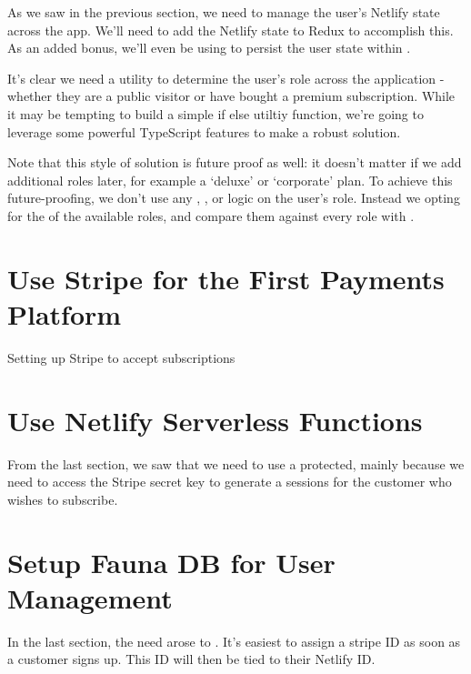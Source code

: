 \documentclass[paper=6in:9in,pagesize=pdftex,headinclude=on,footinclude=on,12pt]{scrbook}
\begin{document}
As we saw in the previous section, we need to manage the user's Netlify state across the app. We'll need to add the Netlify state to Redux to accomplish this. As an added bonus, we'll even be using  to persist the user state within .


It's clear we need a utility to determine the user's role across the application - whether they are a public visitor or have bought a premium subscription. While it may be tempting to build a simple if else utiltiy function, we're going to leverage some powerful TypeScript features to make a robust solution.

Note that this style of solution is future proof as well: it doesn't matter if we add additional roles later, for example a `deluxe' or `corporate' plan. To achieve this future-proofing, we don't use any , , or  logic on the user's role. Instead we opting for the  of the available roles, and compare them against every role with .

\section{Use Stripe for the First Payments Platform}
\begin{arrows}
\item Setting up Stripe to accept subscriptions
\end{arrows}

\section{Use Netlify Serverless Functions}

From the last section, we saw that we need to use a protected, mainly because we need to access the Stripe secret key to generate a sessions for the customer who wishes to subscribe.

\section{Setup Fauna DB for User Management}

In the last section, the need arose to . It's easiest to assign a stripe ID as soon as a customer signs up. This ID will then be tied to their Netlify ID.
\end{document}
